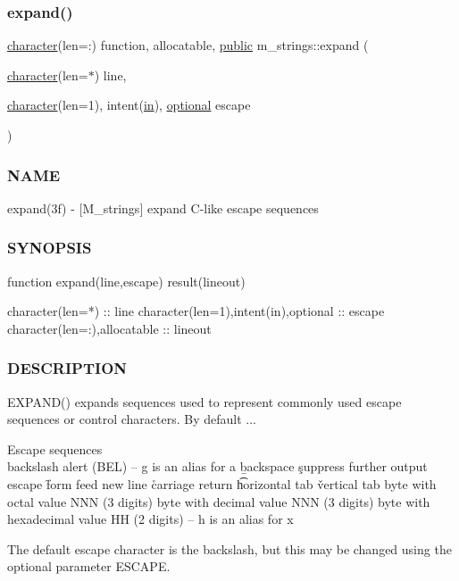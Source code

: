 \subsubsection{\texorpdfstring{expand()}{expand()}}
{\footnotesize\ttfamily \hyperlink{option__stopwatch_83_8txt_abd4b21fbbd175834027b5224bfe97e66}{character}(len=\+:) function, allocatable, \hyperlink{M__stopwatch_83_8txt_a2f74811300c361e53b430611a7d1769f}{public} m\+\_\+strings\+::expand (\begin{DoxyParamCaption}\item[{\hyperlink{option__stopwatch_83_8txt_abd4b21fbbd175834027b5224bfe97e66}{character}(len=$\ast$)}]{line,  }\item[{\hyperlink{option__stopwatch_83_8txt_abd4b21fbbd175834027b5224bfe97e66}{character}(len=1), intent(\hyperlink{M__journal_83_8txt_afce72651d1eed785a2132bee863b2f38}{in}), \hyperlink{option__stopwatch_83_8txt_aa4ece75e7acf58a4843f70fe18c3ade5}{optional}}]{escape }\end{DoxyParamCaption})}



\subsubsection*{N\+A\+ME}

expand(3f) -\/ \mbox{[}M\+\_\+strings\mbox{]} expand C-\/like escape sequences 

\subsubsection*{S\+Y\+N\+O\+P\+S\+IS}

\begin{DoxyVerb}function expand(line,escape) result(lineout)

 character(len=*)                      :: line
 character(len=1),intent(in),optional  :: escape
 character(len=:),allocatable          :: lineout
\end{DoxyVerb}
 \subsubsection*{D\+E\+S\+C\+R\+I\+P\+T\+I\+ON}

\begin{DoxyVerb} EXPAND() expands sequences used to represent commonly used escape sequences
 or control characters. By default ...

 Escape sequences
   \\     backslash
   \a     alert (BEL) -- g is an alias for a
   \b     backspace
   \c     suppress further output
   \e     escape
   \f     form feed
   \n     new line
   \r     carriage return
   \t     horizontal tab
   \v     vertical tab
   \oNNN  byte with octal value NNN (3 digits)
   \dNNN  byte with decimal value NNN (3 digits)
   \xHH   byte with hexadecimal value HH (2 digits) -- h is an alias for x

 The default escape character is the backslash, but this may be changed using
 the optional parameter ESCAPE.
\end{DoxyVerb}


